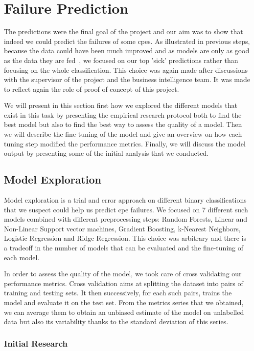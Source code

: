 \section{Failure Prediction}
The predictions were the final goal of the project and our aim was to show that indeed we could predict the failures of some \acrshort{cpe}s. As illustrated in previous steps, because the data could have been much improved and as models are only as good as the data they are fed~\cite{data_preproc}, we focused on our top 'sick' predictions rather than focusing on the whole classification. This choice was again made after discussions with the supervisor of the project and the business intelligence team. It was made to reflect again the role of proof of concept of this project. 

We will present in this section first how we explored the different models that exist in this task by presenting the empirical research protocol both to find the best model but also to find the best way to assess the quality of a model. Then we will describe the fine-tuning of the model and give an overview on how each tuning step modified the performance metrics. Finally, we will discuss the model output by presenting some of the initial analysis that we conducted. 

\subsection{Model Exploration}
Model exploration is a trial and error approach on different binary classifications that we suspect could help us predict \acrshort{cpe} failures. We focused on 7 different such models combined with different preprocessing steps: Random Forests, Linear and Non-Linear Support vector machines, Gradient Boosting, k-Nearest Neighbors, Logistic Regression and Ridge Regression. This choice was arbitrary and there is a tradeoff in the number of models that can be evaluated and the fine-tuning of each model. 

In order to assess the quality of the model, we took care of cross validating our performance metrics. Cross validation aims at splitting the dataset into pairs of training and testing sets. It then successively, for each such pairs, trains the model and evaluate it on the test set. From the metrics series that we obtained, we can average them to obtain an unbiased estimate of the model on unlabelled data but also its variability thanks to the standard deviation of this series. 

\subsubsection{Initial Research}
